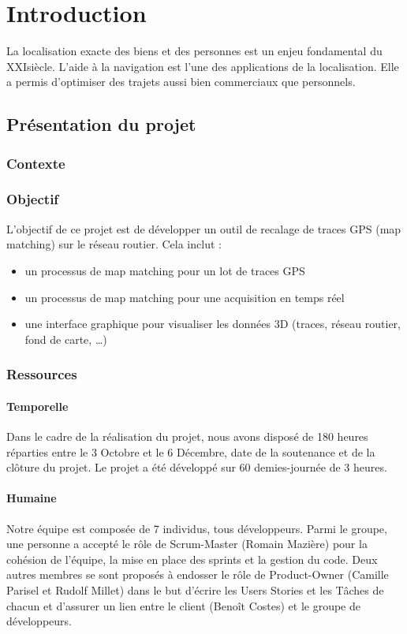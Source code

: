 \chapter{Introduction}
La localisation exacte des biens et des personnes est un enjeu fondamental du XXI\ieme siècle. L'aide à la navigation est l'une des applications de la localisation. Elle a permis d'optimiser des trajets aussi bien commerciaux que personnels.
\section{Présentation du projet}
\subsection{Contexte}

\subsection{Objectif}
L'objectif de ce projet est de développer un outil de recalage de traces GPS (map matching) sur le réseau routier. Cela inclut :
\begin{itemize}
\item{} un processus de map matching pour un lot de traces GPS
\item{} un processus de map matching pour une acquisition en temps réel
\item{} une interface graphique pour visualiser les données 3D (traces, réseau routier, fond de carte, \dots)
\end{itemize}
\subsection{Ressources}
\subsubsection{Temporelle}
Dans le cadre de la réalisation du projet, nous avons disposé de 180 heures réparties entre le 3 Octobre et le 6 Décembre, date de la soutenance et de la clôture du projet. Le projet a été développé sur 60 demies-journée de 3 heures.
\subsubsection{Humaine}
Notre équipe est composée de 7 individus, tous développeurs. Parmi le groupe, une personne a accepté le rôle de Scrum-Master (Romain Mazière) pour la cohésion de l'équipe, la mise en place des sprints et la gestion du code. Deux autres membres se sont proposés à endosser le rôle de Product-Owner (Camille Parisel et Rudolf Millet) dans le but d'écrire les Users Stories et les Tâches de chacun et d'assurer un lien entre le client (Benoît Costes) et le groupe de développeurs.
